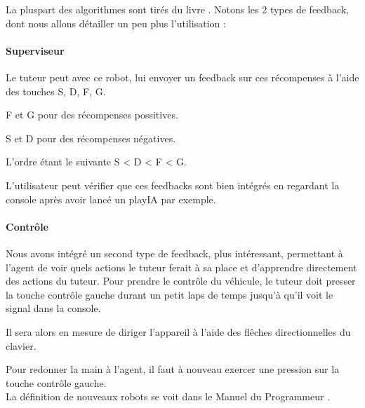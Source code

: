 \documentclass[a4paper,12pt]{article}
\begin{document}
  La pluspart des algorithmes sont tirés du livre \cite{ReinforceLearningIntro}.
  Notons les 2 types de feedback, dont nous allons détailler un peu plus l'utilisation :
  
  \paragraph{Superviseur} Le tuteur peut avec ce robot, lui envoyer un feedback sur ces récompenses
  à l'aide des touches S, D, F, G.

  F et G pour des récompenses possitives.
  
  S et D pour des récompenses négatives.
  
  L'ordre étant le suivante S < D < F < G.  
  
  L'utilisateur peut vérifier que ces feedbacks sont bien intégrés en regardant la console après
  avoir lancé un playIA par exemple.
  \\[1cm]
  
  
  \paragraph{Contrôle} Nous avons intégré un second type de feedback, plus intéressant, 
  permettant à l'agent de voir quels actions le tuteur ferait à sa place et d'apprendre
  directement des actions du tuteur.
  Pour prendre le contrôle du véhicule, le tuteur doit presser la touche contrôle gauche durant
  un petit laps de temps jusqu'à qu'il voit le signal dans la console.
  
  Il sera alors en mesure de diriger l'appareil à l'aide des flêches directionnelles du clavier.
  
  Pour redonner la main à l'agent, il faut à nouveau exercer une pression sur la touche contrôle gauche.
  \\[1cm]
  
  La définition de nouveaux robots se voit dans le Manuel du Programmeur \cite{MdP}.
  
\clearpage
{}


\end{document}
